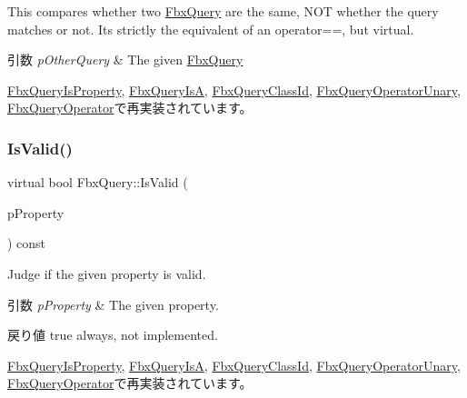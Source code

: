 This compares whether two \hyperlink{class_fbx_query}{Fbx\+Query} are the same, N\+OT whether the query matches or not. It\textquotesingle{}s strictly the equivalent of an operator==, but virtual. 
\begin{DoxyParams}{引数}
{\em p\+Other\+Query} & The given \hyperlink{class_fbx_query}{Fbx\+Query} \\
\hline
\end{DoxyParams}


\hyperlink{class_fbx_query_is_property_ace0b3dd62cc2614acc88ad892849416b}{Fbx\+Query\+Is\+Property}, \hyperlink{class_fbx_query_is_a_a49b41a34152be44240671b8ae59a4d19}{Fbx\+Query\+IsA}, \hyperlink{class_fbx_query_class_id_ac20046270f87a7bb84fbf776980431af}{Fbx\+Query\+Class\+Id}, \hyperlink{class_fbx_query_operator_unary_a36c2fea0f42bd732d559375d64b0134e}{Fbx\+Query\+Operator\+Unary}, \hyperlink{class_fbx_query_operator_aa96734a4da59286a2cab2832f0529175}{Fbx\+Query\+Operator}で再実装されています。

\mbox{\label{class_fbx_query_a822776baf45a56d8e126e948ec25d920}} 
\subsubsection{\texorpdfstring{Is\+Valid()}{IsValid()}}
{\footnotesize\ttfamily virtual bool Fbx\+Query\+::\+Is\+Valid (\begin{DoxyParamCaption}\item[{const \hyperlink{class_fbx_property}{Fbx\+Property} \&}]{p\+Property }\end{DoxyParamCaption}) const\hspace{0.3cm}{\ttfamily [virtual]}}

Judge if the given property is valid. 
\begin{DoxyParams}{引数}
{\em p\+Property} & The given property. \\
\hline
\end{DoxyParams}
\begin{DoxyReturn}{戻り値}
{\ttfamily true} always, not implemented. 
\end{DoxyReturn}


\hyperlink{class_fbx_query_is_property_a6f9680d513428cba6321203c9b3da71e}{Fbx\+Query\+Is\+Property}, \hyperlink{class_fbx_query_is_a_a6d3da2f05ab6e50346af8e9713168772}{Fbx\+Query\+IsA}, \hyperlink{class_fbx_query_class_id_aaa9990771cab43ddc199eaeac2b6d754}{Fbx\+Query\+Class\+Id}, \hyperlink{class_fbx_query_operator_unary_a4987590ec1680775240b813ec3b2ffb4}{Fbx\+Query\+Operator\+Unary}, \hyperlink{class_fbx_query_operator_a14dd8a653d1e802f43b60c13d137ccce}{Fbx\+Query\+Operator}で再実装されています。

